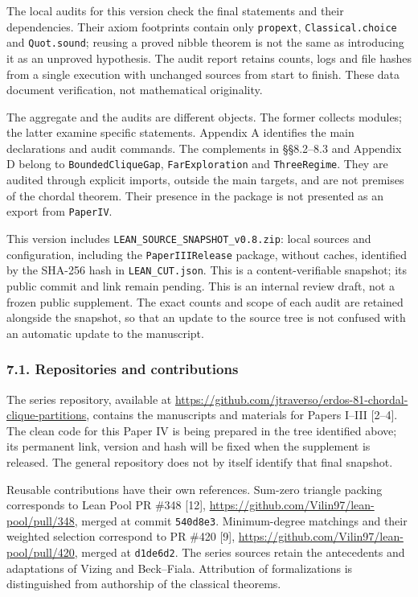 \documentclass[english,11pt,a4paper]{article}
\begin{document}
The local audits for this version check the final statements and their dependencies. Their axiom footprints contain only \nolinkurl{propext}, \nolinkurl{Classical.choice} and \nolinkurl{Quot.sound}; reusing a proved nibble theorem is not the same as introducing it as an unproved hypothesis. The audit report retains counts, logs and file hashes from a single execution with unchanged sources from start to finish. These data document verification, not mathematical originality.

The aggregate and the audits are different objects. The former collects modules; the latter examine specific statements. Appendix A identifies the main declarations and audit commands. The complements in §§8.2--8.3 and Appendix D belong to \nolinkurl{BoundedCliqueGap}, \nolinkurl{FarExploration} and \nolinkurl{ThreeRegime}. They are audited through explicit imports, outside the main targets, and are not premises of the chordal theorem. Their presence in the package is not presented as an export from \nolinkurl{PaperIV}.

This version includes \nolinkurl{LEAN_SOURCE_SNAPSHOT_v0.8.zip}: local sources and configuration, including the \nolinkurl{PaperIIIRelease} package, without caches, identified by the SHA-256 hash in \nolinkurl{LEAN_CUT.json}. This is a content-verifiable snapshot; its public commit and link remain pending. This is an internal review draft, not a frozen public supplement. The exact counts and scope of each audit are retained alongside the snapshot, so that an update to the source tree is not confused with an automatic update to the manuscript.

\subsubsection{7.1. Repositories and contributions}\label{repositories-and-contributions}

The series repository, available at \url{https://github.com/jtraverso/erdos-81-chordal-clique-partitions}, contains the manuscripts and materials for Papers I--III {[}2--4{]}. The clean code for this Paper IV is being prepared in the tree identified above; its permanent link, version and hash will be fixed when the supplement is released. The general repository does not by itself identify that final snapshot.

Reusable contributions have their own references. Sum-zero triangle packing corresponds to Lean Pool PR \#348 {[}12{]}, \url{https://github.com/Vilin97/lean-pool/pull/348}, merged at commit \nolinkurl{540d8e3}. Minimum-degree matchings and their weighted selection correspond to PR \#420 {[}9{]}, \url{https://github.com/Vilin97/lean-pool/pull/420}, merged at \nolinkurl{d1de6d2}. The series sources retain the antecedents and adaptations of Vizing and Beck--Fiala. Attribution of formalizations is distinguished from authorship of the classical theorems.
\end{document}
